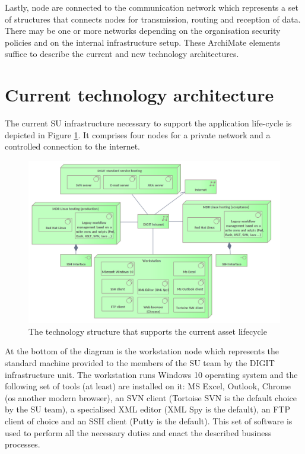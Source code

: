 	Lastly, node are connected to the communication network which represents a set of structures that connects nodes for transmission, routing and reception of data. There may be one or more networks depending on the organisation security policies and on the internal infrastructure setup. These ArchiMate elements suffice to describe the current and new technology architectures. 	
	
	\section{Current technology architecture}
	\label{sec:technology-current}
	
	The current SU infrastructure necessary to support the application life-cycle is depicted in Figure \ref{fig:technology-current}. It comprises four nodes for a private network and a controlled connection to the internet. 
	
	\begin{figure}[!h]
		\centering
		\includegraphics[width=1.01\textwidth]{images/technology/Current Platform.png}
		\caption{The technology structure that supports the current asset lifecycle}
		\label{fig:technology-current}
	\end{figure}
	
	At the bottom of the diagram is the workstation node which represents the standard machine provided to the members of the SU team by the DIGIT infrastructure unit. The workstation runs Windows 10 \citep{windows10} operating system and the following set of tools (at least) are installed on it: MS Excel, Outlook, Chrome (os another modern browser), an SVN client (Tortoise SVN is the default choice by the SU team), a specialised XML editor (XML Spy is the default), an FTP client of choice and an SSH client (Putty is the default). This set of software is used to perform all the necessary duties and enact the described business processes. 
	

